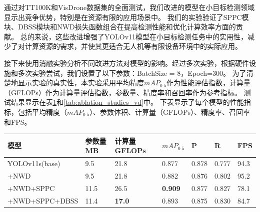 通过对TT100K和VisDrone数据集的全面测试，我们改进的模型在小目标检测领域显示出竞争优势，特别是在资源有限的应用场景中。 我们的实验验证了SPPC模块、DBSS模块和NWD损失函数组合在提高检测性能和优化计算效率方面的贡献。 总的来说，这些改进增强了YOLOv11模型在小目标检测任务中的实用性，减少了对计算资源的需求，并使其更适合无人机等有限设备环境中的实际应用。

接下来使用消融实验分析不同改进方法对模型的影响。经过多次实验，根据硬件设施和多次实验尝试，我们设置了以下参数：BatchSize = 8，Epoch=300。 为了清楚地显示实验的真实性，本实验采用平均精度$mAP_{0.5}$作为性能评估指数，计算量（GFLOPs）作为计算量评估指数，参数量、精度率和召回率作为参考指标。 测试结果显示在表\ref{tab:ablation_studies_tt100k}和\ref{tab:ablation_studies_vd}中。 下表显示了每个模型的性能指标，包括平均精度（$mAP_{0.5}$）、参数体积、计算量（GFLOPs）、精度率、召回率和FPS。

\begin{table}[htbp]
    \centering
    \captionsetup{font=footnotesize}
    \label{tab:ablation_studies_tt100k}
    \begin{tabular}{p{}p{}p{}p{}p{}p{}p{}}
        \toprule
        模型       & 参数量 MB & 计算量 GFLOPs & $mAP_{0.5}$   & P     & R     & FPS \\ 
        \midrule
        YOLOv11s(base) & 9.5           & 21.8         & 0.877          & 0.878  & 0.777 & 94.3 \\
        +NWD           & 9.5           & 21.8         & 0.882          & 0.876  & 0.802 & 95.2 \\
        +NWD+SPPC      & 11.5          & 26.5         & \textbf{0.909} & 0.877  & 0.827 & 78.1 \\
        +NWD+SPPC+DBSS & 11.4          & \textbf{17.0} & 0.893          & 0.875  & 0.830 & 84.7 \\
        \bottomrule
    \end{tabular}
\end{table}

